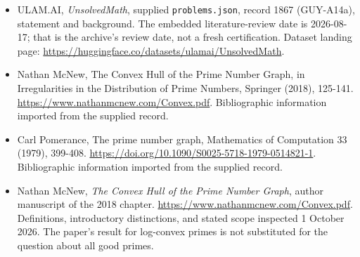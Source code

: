 \documentclass[11pt,a4paper]{article}
\begin{document}
{\small

\begin{itemize}

\item[\hypertarget{source:1867:1}{S1}] ULAM.AI, \emph{UnsolvedMath}, supplied \texttt{problems.json}, record 1867 (GUY-A14a), statement and background. The embedded literature-review date is 2026-08-17; that is the archive’s review date, not a fresh certification. Dataset landing page: \url{https://huggingface.co/datasets/ulamai/UnsolvedMath}.

\item[\hypertarget{source:1867:2}{S2}] Nathan McNew, The Convex Hull of the Prime Number Graph, in Irregularities in the Distribution of Prime Numbers, Springer (2018), 125-141. \url{https://www.nathanmcnew.com/Convex.pdf}. Bibliographic information imported from the supplied record.

\item[\hypertarget{source:1867:3}{S3}] Carl Pomerance, The prime number graph, Mathematics of Computation 33 (1979), 399-408. \url{https://doi.org/10.1090/S0025-5718-1979-0514821-1}. Bibliographic information imported from the supplied record.


\item[E1] Nathan McNew, \emph{The Convex Hull of the Prime Number
Graph}, author manuscript of the 2018 chapter.
\url{https://www.nathanmcnew.com/Convex.pdf}.
Definitions, introductory distinctions, and stated scope inspected
1 October 2026. The paper's result for log-convex primes is not
substituted for the question about all good primes.

\end{itemize}

}

\label{end:1867}
\end{document}
